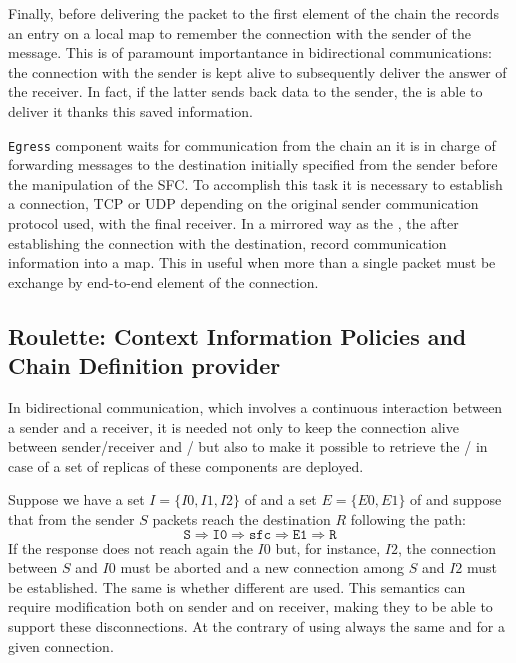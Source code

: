 Finally, before delivering the packet to the first element of the chain the
\ingress{} records an entry on a local map to remember the connection with
the sender of the message. This is of paramount importantance in bidirectional
communications: the connection with the sender is kept alive to
subsequently deliver the answer of the receiver. In fact, if the latter sends
back data to the sender, the \ingress{} is able to deliver it thanks this
saved information.

\texttt{Egress} component waits for communication from the chain an it is in
charge of forwarding messages to the destination initially specified from the
sender before the manipulation of the SFC. To accomplish this task it is
necessary to establish a connection, TCP or UDP depending on the original
sender communication protocol used, with the final receiver. In a mirrored way
as the \ingress{}, the \egress{} after establishing the connection with the
destination, record communication information into a map. This in useful when
more than a single packet must be exchange by end-to-end element of the
connection.

\subsection{Roulette: Context Information Policies and Chain Definition
provider}
In bidirectional communication, which involves a continuous interaction between a
sender and a receiver, it is needed not only to keep the connection alive
between sender/receiver and \ingress{}/\egress{} but also to make it possible to
retrieve the \ingress{}/\egress{} in case of a set of replicas of these
components are deployed.
\begin{exmp}
  Suppose we have a set $I=\{I0, I1, I2\}$ of \ingresses{} and a set $E=\{E0,
  E1\}$ of \egresses{} and suppose that from the sender $S$ packets reach the
  destination $R$ following the path:
  \begin{equation*}
    \texttt{S} \Longrightarrow \texttt{I0} \Longrightarrow \texttt{sfc}
    \Longrightarrow \texttt{E1} \Longrightarrow \texttt{R}
  \end{equation*}
  If the response does not reach again the \ingress{} $I0$ but, for instance,
  $I2$, the connection between $S$ and $I0$ must be aborted and a new connection
  among $S$ and $I2$ must be established. The same is whether different
  \egresses{} are used. This semantics can require modification both on sender
  and on receiver, making they to be able to support these disconnections. At
  the contrary of using always the same \ingress{} and \egress{} for a given
  connection.
\end{exmp}

